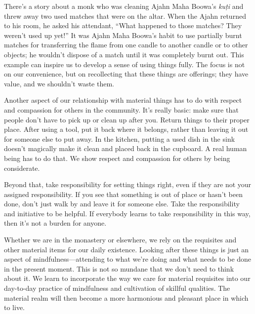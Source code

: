 There's a story about a monk who was cleaning Ajahn Maha Boowa's 
\emph{kuṭi} and threw away two used matches that were on the altar. 
When the Ajahn returned to his room, he asked his attendant, ``What 
happened to those matches? They weren't used up yet!'' It was Ajahn 
Maha Boowa's habit to use partially burnt matches for transferring the 
flame from one candle to another candle or to other objects; he 
wouldn't dispose of a match until it was completely burnt out. This 
example can inspire us to develop a sense of using things fully. The 
focus is not on our convenience, but on recollecting that these things 
are offerings; they have value, and we shouldn't waste them.

Another aspect of our relationship with material things has to do with 
respect and compassion for others in the community. It's really basic: 
make sure that people don't have to pick up or clean up after you. 
Return things to their proper place. After using a tool, put it back 
where it belongs, rather than leaving it out for someone else to put 
away. In the kitchen, putting a used dish in the sink doesn't magically 
make it clean and placed back in the cupboard. A real human being has 
to do that. We show respect and compassion for others by being 
considerate.

Beyond that, take responsibility for setting things right, even if they 
are not your assigned responsibility. If you see that something is out 
of place or hasn't been done, don't just walk by and leave it for 
someone else. Take the responsibility and initiative to be helpful. If 
everybody learns to take responsibility in this way, then it's not a 
burden for anyone.

Whether we are in the monastery or elsewhere, we rely on the requisites 
and other material items for our daily existence. Looking after these 
things is just an aspect of mindfulness---attending to what we're doing 
and what needs to be done in the present moment. This is not so mundane 
that we don't need to think about it. We learn to incorporate the way 
we care for material requisites into our day-to-day practice of 
mindfulness and cultivation of skillful qualities. The material realm 
will then become a more harmonious and pleasant place in which to live.


